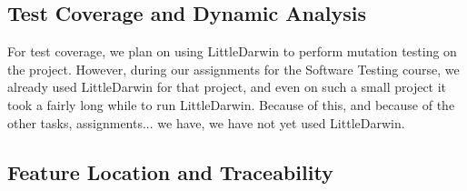 \documentclass{article}
\begin{document}
\subsection{Test Coverage and Dynamic Analysis}

For test coverage, we plan on using LittleDarwin to perform mutation testing on the project. However, during our assignments for the Software Testing course, we already used LittleDarwin for that project, and even on such a small project it took a fairly long while to run LittleDarwin. Because of this, and because of the other tasks, assignments... we have, we have not yet used LittleDarwin.

\subsection{Feature Location and Traceability}
\end{document}
